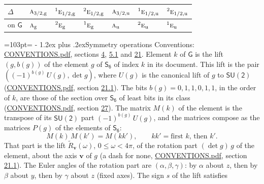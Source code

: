 \documentclass[10pt,a4paper]{article}
\makeatletter
\renewcommand\section{\@startsection{section}{1}{\z@}{-3ex plus -1ex minus -.2ex}%
  {1.2ex plus .2ex}{\normalfont\large\sffamily\bfseries\color{parttitle}}}
\newcommand{\needspace}[1]{\par\penalty-100\begingroup\dimen0=#1\relax\dimen2=\pagegoal
  \advance\dimen2-\pagetotal\ifdim\dimen0>\dimen2\relax\ifdim\dimen2>0pt\vfil\break\fi\fi
  \endgroup}
\numberwithin{equation}{section}
\newcommand{\grp}[1]{\mathsf{#1}}
\newcommand{\irr}[1]{\text{\normalfont\scshape #1}}
\newcommand{\conjpair}[1]{{}^{#1}}
\newcommand{\ptag}[1]{\mathrm{#1}}
\newcommand{\vv}{\mathbf{v}}
\newcommand{\lift}[1]{\tilde{#1}}
\makeatother
\begin{document}
\begin{center}\begin{tabular}{@{}lllllll@{}}\toprule
$\Delta$ & $\irr{a}_{3/2,\ptag{g}}$ & $\conjpair{1}\irr{e}_{1/2,\ptag{g}}$ & $\conjpair{2}\irr{e}_{1/2,\ptag{g}}$ & $\irr{a}_{3/2,\ptag{u}}$ & $\conjpair{1}\irr{e}_{1/2,\ptag{u}}$ & $\conjpair{2}\irr{e}_{1/2,\ptag{u}}$\\\midrule
on $\grp{G}$ & $\irr{a}_{\ptag{g}}$ & $\conjpair{2}\irr{e}_{\ptag{g}}$ & $\conjpair{1}\irr{e}_{\ptag{g}}$ & $\irr{a}_{\ptag{u}}$ & $\conjpair{2}\irr{e}_{\ptag{u}}$ & $\conjpair{1}\irr{e}_{\ptag{u}}$\\
\bottomrule\end{tabular}\end{center}
\needspace{103pt}
\section{Symmetry operations}\label{s:elements}
Conventions: \href{../../CONVENTIONS.pdf}{CONVENTIONS.pdf}, sections \href{../../../rotation/CONVENTIONS.pdf\#conv.4}{4}, \href{../../../rotation/CONVENTIONS.pdf\#conv.5.1}{5.1} and \href{../../CONVENTIONS.pdf\#conv.21}{21}.
\leavevmode\label{n:index.element}\label{n:element.g}\label{n:function.section}Element $k$ of $\grp{G}$ is the lift $(g, b(g))$ of the element $g$ of \href{../../../rotation/data/pdf/S6.pdf}{$\grp{S_{6}}$} of index $k$ in its document. This lift is the pair $((-1)^{b(g)}\,U(g), \det g)$, where $U(g)$ is the canonical lift of $g$ to $\grp{SU(2)}$ (\href{../../CONVENTIONS.pdf}{CONVENTIONS.pdf}, section \href{../../CONVENTIONS.pdf\#conv.21.1}{21.1}). The bits $b(g) = 0, 1, 1, 0, 1, 1$, in the order of $k$, are those of the section over $\grp{S_{6}}$ of least bits in its class (\href{../../CONVENTIONS.pdf}{CONVENTIONS.pdf}, section \href{../../CONVENTIONS.pdf\#conv.27}{27}). \label{n:matrix.element.pin}\label{n:matrix.element}The matrix $M(k)$ of the element is the transpose of its $\grp{SU(2)}$ part $(-1)^{b(g)}\,U(g)$, and the matrices compose as the matrices $P(g)$ of the elements of $\grp{S_{6}}$:
\begin{equation}\label{e:mprod}M(k)\,M(k') = M(kk'),\qquad kk' = \text{first } k\text{, then } k'.\end{equation}
\leavevmode\label{n:angle.omega}\label{n:vector.axis}\label{n:vector.pole}That part is the lift $\lift{R}_{\vv}(\omega)$, $0 \le \omega < 4\pi$, of the rotation part $(\det g)\,g$ of the element, about the axis $\vv$ of $g$ (a dash for none, \href{../../CONVENTIONS.pdf}{CONVENTIONS.pdf}, section \href{../../CONVENTIONS.pdf\#conv.21.1}{21.1}). \label{n:angle.euler.alpha}\label{n:angle.euler.beta}\label{n:angle.euler.gamma}\label{n:vector.coordinates}The Euler angles of the rotation part are $(\alpha,\beta,\gamma)$: by $\alpha$ about $z$, then by $\beta$ about $y$, then by $\gamma$ about $z$ (fixed axes). \label{n:local.euler.sign}The sign $s$ of the lift satisfies
\end{document}
